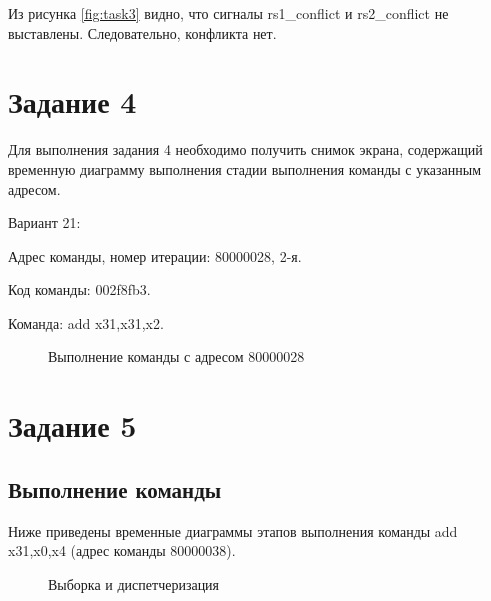 Из рисунка \ref{fig:task3} видно, что сигналы rs1\_conflict и rs2\_conflict не выс\-тавлены.
Следовательно, конфликта нет.

\clearpage
\section{Задание 4}
Для выполнения задания 4 необходимо получить снимок экрана, содер\-жащий
временную диаграмму выполнения стадии выполнения команды с указанным
адресом.

Вариант 21:

\hspace{1cm} Адрес команды, номер итерации: 80000028, 2-я.
 
\hspace{1cm} Код команды: 002f8fb3.
 
\hspace{1cm} Команда: add x31,x31,x2.

\begin{figure}[ph!]
    \caption{Выполнение команды с адресом 80000028}
\end{figure}

\clearpage
\section{Задание 5}

\subsection{Выполнение команды}

Ниже приведены временные диаграммы этапов выполнения команды
add x31,x0,x4 (адрес команды 80000038). 

\begin{figure}[ph!]
    \caption{Выборка и диспетчеризация}
\end{figure}

